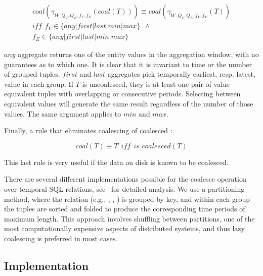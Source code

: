 \begin{multline}
coal(\gamma_{W,Q_V,Q_E,f_V,f_E}(coal(T))) \equiv coal(\gamma_{W,Q_V,Q_E,f_V,f_E}(T)) \\
iff~~f_V \in \{any | first | last | min | max\}~~\wedge \\
f_E \in \{any | first | last | min | max\}
\label{rul:coalr10}
\end{multline}

$any$ aggregate returns one of the entity values in the aggregation
window, with no guarantees as to which one.  It is clear that it is
invariant to time or the number of grouped tuples.  $first$ and $last$
aggregates pick temporally earliest, resp. latest, value in each
group.  If $T$ is uncoalesced, they is at least one pair of
value-equivalent tuples with overlapping or consecutive periods.
Selecting between equivalent values will generate the same result
regardless of the number of those values.  The same argument applies
to $min$ and $max$.

Finally, a rule that eliminates coalescing of coalesced \tgs:

\begin{equation}
coal(T) \equiv T~~iff~~is\_coalesced(T)
\label{rul:coalr11}
\end{equation}

This last rule is very useful if the data on disk is known to be
coalesced.

There are several different implementations possible for the coalesce
operation over temporal SQL relations,
see~\cite{DBLP:conf/vldb/BohlenSS96} for detailed analysis.  We use a
partitioning method, where the relation (e.g., \tv, \te, \trg) is
grouped by key, and within each group the tuples are sorted and folded
to produce the corresponding time periods of maximum length.  This
approach involves shuffling between partitions, one of the most
computationally expensive aspects of distributed systems, and thus
lazy coalescing is preferred in most cases.

\subsection{Implementation}
\label{sec:sys:maint}

